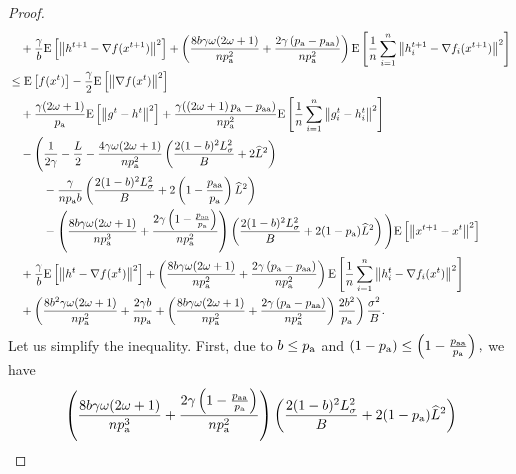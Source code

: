 \documentclass{article}
\newcommand*{\probavailable}{\ensuremath{p_{\textnormal{a}}}}
\newcommand*{\probpairaa}{\ensuremath{p_{\textnormal{aa}}}}
\begin{document}
\begin{proof}
\begin{align*}
      &\quad  + \frac{\gamma}{b} \Exp{\norm{h^{t+1} - \nabla f(x^{t+1})}^2} + \left(\frac{8 b \gamma \omega (2 \omega + 1)}{n \probavailable^2} + \frac{2 \gamma \left(\probavailable - \probpairaa\right)}{n \probavailable^2}\right) \Exp{\frac{1}{n}\sum_{i=1}^n\norm{h^{t+1}_i - \nabla f_i(x^{t+1})}^2}\\
      &\leq \Exp{f(x^t)} - \frac{\gamma}{2}\Exp{\norm{\nabla f(x^t)}^2} \\
      &\quad + \frac{\gamma (2 \omega + 1)}{\probavailable} \Exp{\norm{g^{t} - h^{t}}^2} + \frac{\gamma (\left(2 \omega + 1\right)\probavailable - \probpairaa)}{n \probavailable^2} \Exp{\frac{1}{n}\sum_{i=1}^n\norm{g^{t}_i - h^{t}_i}^2} \\
      &\quad - \Bigg(\frac{1}{2\gamma} - \frac{L}{2} - \frac{4 \gamma \omega (2 \omega + 1)}{n \probavailable^2} \left(\frac{2 (1 - b)^2 L_{\sigma}^2}{B} + 2 \widehat{L}^2\right) \\
      &\qquad\quad - \frac{\gamma}{n \probavailable b}\left(\frac{2 (1 - b)^2 L_{\sigma}^2}{B} + 2\left(1 - \frac{\probpairaa}{\probavailable}\right) \widehat{L}^2 \right) \\
      &\qquad\quad - \left(\frac{8 b \gamma \omega (2 \omega + 1)}{n \probavailable^3} + \frac{2 \gamma \left(1 - \frac{\probpairaa}{\probavailable}\right)}{n \probavailable^2}\right) \left(\frac{2 (1 - b)^2 L_{\sigma}^2}{B} + 2(1 - \probavailable) \widehat{L}^2\right)\Bigg) \Exp{\norm{x^{t+1} - x^t}^2} \\
      &\quad + \frac{\gamma}{b} \Exp{\norm{h^{t} - \nabla f(x^{t})}^2} + \left(\frac{8 b \gamma \omega (2 \omega + 1)}{n \probavailable^2} + \frac{2 \gamma \left(\probavailable - \probpairaa\right)}{n \probavailable^2}\right)\Exp{\frac{1}{n}\sum_{i=1}^n\norm{h^{t}_i - \nabla f_i(x^{t})}^2} \\
      &\quad + \left(\frac{8 b^2 \gamma \omega (2 \omega + 1)}{n \probavailable^2} + \frac{2 \gamma b}{n \probavailable} + \left(\frac{8 b \gamma \omega (2 \omega + 1)}{n \probavailable^2} + \frac{2 \gamma \left(\probavailable - \probpairaa\right)}{n \probavailable^2}\right) \frac{2 b^2}{\probavailable}\right) \frac{\sigma^2}{B}.
    \end{align*}
    Let us simplify the inequality. First, due to $b \leq \probavailable$ and $\left(1 - \probavailable\right) \leq \left(1 - \frac{\probpairaa}{\probavailable}\right),$ we have
    \begin{align*}
      &\left(\frac{8 b \gamma \omega (2 \omega + 1)}{n \probavailable^3} + \frac{2 \gamma \left(1 - \frac{\probpairaa}{\probavailable}\right)}{n \probavailable^2}\right) \left(\frac{2 (1 - b)^2 L_{\sigma}^2}{B} + 2(1 - \probavailable) \widehat{L}^2\right) \\

\end{align*}
\end{proof}
\end{document}

